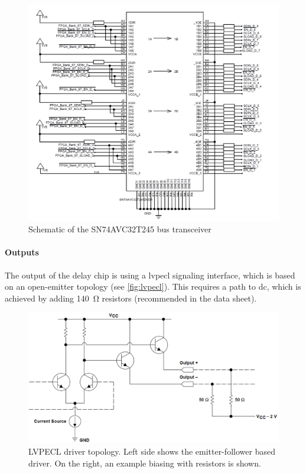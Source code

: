 \begin{figure}[tb]
	\centering
	\includegraphics[width = \textwidth]{chap/04-theresa/img/schematic/level_trans}
	\caption[SN74AVC32T245 bus transceiver]{Schematic of the SN74AVC32T245 bus transceiver}
	\label{fig:level_trans}
\end{figure}

\paragraph{Outputs}
The output of the delay chip is using a \gls{lvpecl} signaling interface, which is based on an open-emitter topology (see \autoref{fig:lvpecl}).
This requires a path to \gls{dc}, which is achieved by adding \SI{140}{\ohm} resistors (recommended in the data sheet).

\begin{figure}[tb]
	\centering
	\includegraphics[width = \textwidth]{chap/04-theresa/img/lvpecl}
	\caption[LVPECL driver topology]{LVPECL driver topology. Left side shows the emitter-follower based driver. On the right, an example biasing with resistors is shown. \cite{lvpecl}}
	\label{fig:lvpecl}
\end{figure}

